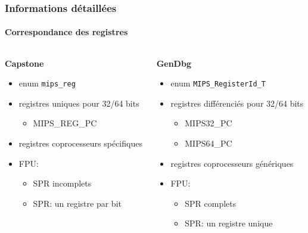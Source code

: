 \documentclass[aspectratio=169,11pt]{beamer}
\newcommand{\code}[1]{\texttt{#1}}
\begin{document}
			\begin{frame}
				\frametitle{Informations détaillées}
				\framesubtitle{Correspondance des registres}
				\begin{columns}[t]
					\begin{column}{0.5\textwidth}
						\textbf{Capstone}
						\begin{itemize}
							\item enum \code{mips\_reg}
							\item registres uniques pour 32/64 bits
								\begin{itemize}
									\item MIPS\_REG\_PC
								\end{itemize}
							\item<2-> registres coprocesseurs spécifiques
							\item<3-> FPU:
								\begin{itemize}
									\item<3-> SPR incomplets
									\item<3-> SPR: un registre par bit
								\end{itemize}
						\end{itemize}
					\end{column}
					\begin{column}{0.5\textwidth}
						\textbf{GenDbg}
						\begin{itemize}
							\item enum \code{MIPS\_RegisterId\_T}
							\item registres différenciés pour 32/64 bits
								\begin{itemize}
									\item MIPS32\_PC
									\item MIPS64\_PC
								\end{itemize}
							\item<2-> registres coprocesseurs génériques
							\item<3-> FPU:
								\begin{itemize}
									\item<3-> SPR complets
									\item<3-> SPR: un registre unique
								\end{itemize}
						\end{itemize}
					\end{column}
				\end{columns}
			\end{frame}
\end{document}
